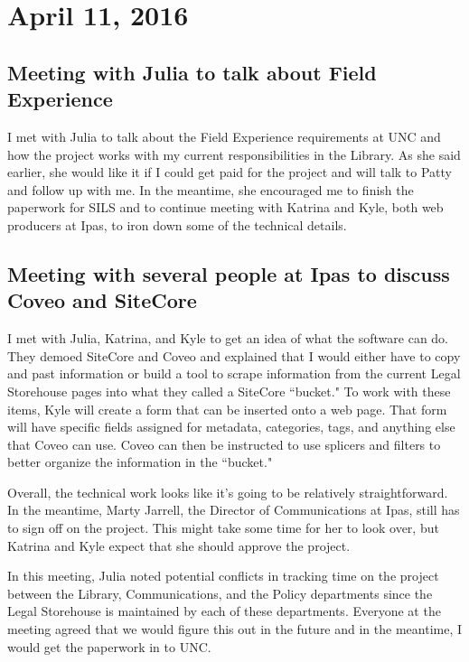 \documentclass{article}
\begin{document}
\section{April 11, 2016} \label{2016-04-11}
\subsection{Meeting with Julia to talk about Field Experience}
I met with Julia to talk about the Field Experience requirements at UNC and how the project works with my current responsibilities in the Library. As she said earlier, she would like it if I could get paid for the project and will talk to Patty and follow up with me. In the meantime, she encouraged me to finish the paperwork for SILS and to continue meeting with Katrina and Kyle, both web producers at Ipas, to iron down some of the technical details.

\subsection{Meeting with several people at Ipas to discuss Coveo and SiteCore}
I met with Julia, Katrina, and Kyle to get an idea of what the software can do. They demoed SiteCore and Coveo and explained that I would either have to copy and past information or build a tool to scrape information from the current Legal Storehouse pages into what they called a SiteCore ``bucket." To work with these items, Kyle will create a form that can be inserted onto a web page. That form will have specific fields assigned for metadata, categories, tags, and anything else that Coveo can use. Coveo can then be instructed to use splicers and filters to better organize the information in the ``bucket."

Overall, the technical work looks like it's going to be relatively straightforward. In the meantime, Marty Jarrell, the Director of Communications at Ipas, still has to sign off on the project. This might take some time for her to look over, but Katrina and Kyle expect that she should approve the project. 

In this meeting, Julia noted potential conflicts in tracking time on the project between the Library, Communications, and the Policy departments since the Legal Storehouse is maintained by each of these departments. Everyone at the meeting agreed that we would figure this out in the future and in the meantime, I would get the paperwork in to UNC.
\end{document}
